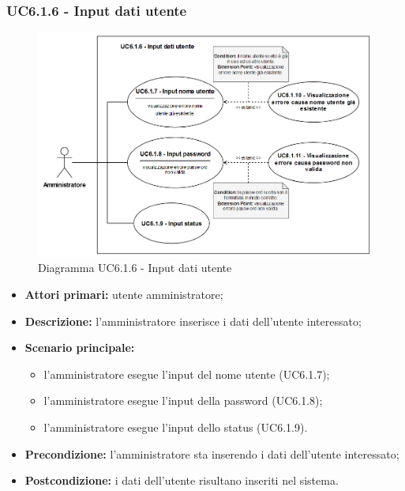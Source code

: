 \subsubsection{UC6.1.6 - Input dati utente}
	\begin{figure}[H]
		\centering
		\includegraphics[width=15cm]{images/UC6.1.6.png}
		\caption{Diagramma UC6.1.6 - Input dati utente}
	\end{figure}
	\begin{itemize}
		\item \textbf{Attori primari:} utente amministratore;
		\item \textbf{Descrizione:} l'amministratore inserisce i dati dell'utente interessato;
		\item \textbf{Scenario principale:} 
			\begin{itemize}
				\item l'amministratore esegue l'input del nome utente (UC6.1.7);
				\item l'amministratore esegue l'input della password (UC6.1.8);
				\item l'amministratore esegue l'input dello status (UC6.1.9).
			\end{itemize}
		\item \textbf{Precondizione:} l'amministratore sta inserendo i dati dell'utente interessato;
		\item \textbf{Postcondizione:} i dati dell'utente risultano inseriti nel sistema.
	\end{itemize}

